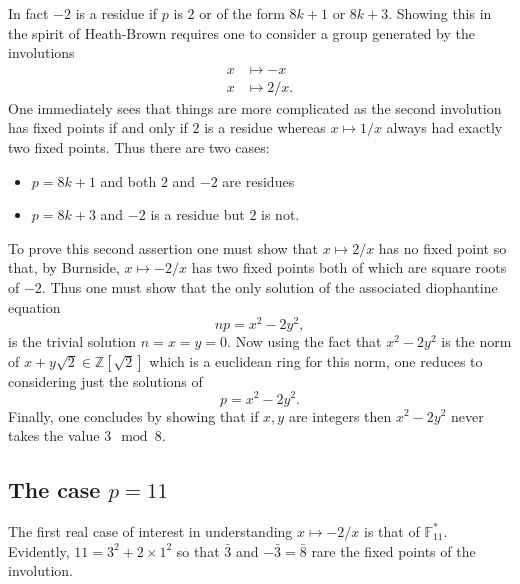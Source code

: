 \documentclass[12pt,a4paper]{amsart}
\begin{document}
In fact  $-2$  is a residue if $p$ is $2$ or of the form $8k+1$ or $8k+3$.
Showing this in the spirit of Heath-Brown requires one to consider a group generated by the involutions 
\begin{eqnarray*}
x & \mapsto -x \\
x & \mapsto 2/x.
\end{eqnarray*}
One immediately sees that things are more complicated as the
second involution has fixed points if and only if $2$ is a residue
whereas $x\mapsto 1/x$ always had exactly two fixed points.
Thus there are two cases:
\begin{itemize}
	\item $p=8k+1$ and both $2$ and $-2$ are residues
	\item $p=8k+3$ and $-2$ is a residue but $2$ is not.
\end{itemize}
To prove this second assertion 
one must show that 
$x  \mapsto 2/x$ has no fixed point
so that, by Burnside,
$x  \mapsto -2/x$ has two fixed points 
both of which are square roots of $-2$.
Thus one must show that the only solution of the associated diophantine equation 
$$np = x^2 - 2y^2,$$
is the trivial solution $n=x=y=0$.
Now using the fact that 
$x^2 - 2y^2$ 
is the norm of $x+y \sqrt{2}\in \mathbb{Z}[\sqrt{2}]$ which is a
euclidean ring for this norm,
one reduces to considering just the solutions of 
$$p = x^2 - 2y^2.$$
Finally, 
one concludes by showing that if $x,y$ are integers then
$x^2 - 2y^2$ never takes the value $3 \mod 8$.

\subsection{The case $p=11$}

The first real case of interest in understanding 
$x\mapsto -2/x$ is that of $\mathbb{F}_{11}^*$.
Evidently, $11 = 3^2 + 2\times 1^2$ so that 
$\bar{3}$ and $-\bar{3} = \bar{8}$ rare the fixed points of the involution.
\end{document}
